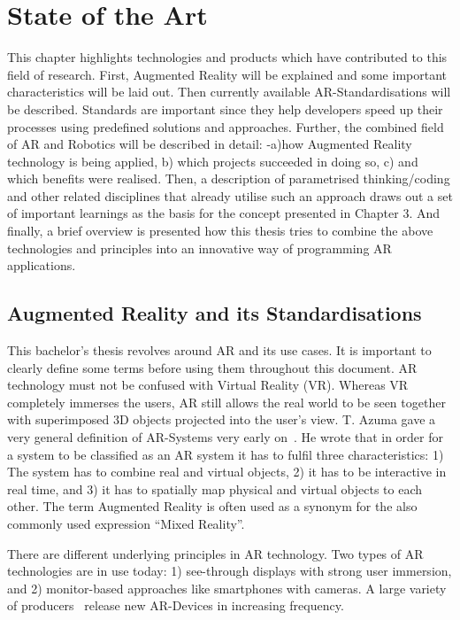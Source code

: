 \chapter{State of the Art}\label{Chap:StateOfTheArt}

This chapter highlights technologies and products which have contributed to this field of research. First, Augmented Reality will be explained and some important characteristics will be laid out. Then currently available AR-Standardisations will be described. Standards are  important since they help developers speed up their processes using predefined solutions and approaches. Further, the combined field of AR and Robotics will be described in detail:  -a)how Augmented Reality technology is being applied, b) which projects succeeded in doing so, c) and which benefits were realised. Then, a description of parametrised thinking/coding and other related disciplines that already utilise such an approach draws out a set of important learnings as the basis for the concept presented in Chapter 3. And finally, a brief overview is presented how this thesis tries to combine the above technologies and principles into an innovative way of programming AR applications.

\section{Augmented Reality and its Standardisations}

This bachelor’s thesis revolves around AR and its use cases. It is important to clearly define some terms before using them throughout this document. AR technology must not be confused with Virtual Reality (VR). Whereas VR completely immerses the users, AR still allows the real world to be seen together with superimposed 3D objects projected into the user’s view. T. Azuma gave a very general definition of AR-Systems very early on~\cite{azuma1997survey}. He wrote that in order for a system to be classified as an AR system it has to fulfil three characteristics: 1) The system has to combine real and virtual objects, 2) it has to be interactive in real time, and 3) it has to spatially map physical and virtual objects to each other. The term Augmented Reality is often used as a synonym for the also commonly used expression “Mixed Reality”. 

There are different underlying principles in AR technology. Two types of AR technologies are in use today: 1) see-through displays with strong user immersion, and 2) monitor-based approaches like smartphones with cameras. A large variety of producers~\cite{ARProudcersVariety} release new AR-Devices in increasing frequency.

